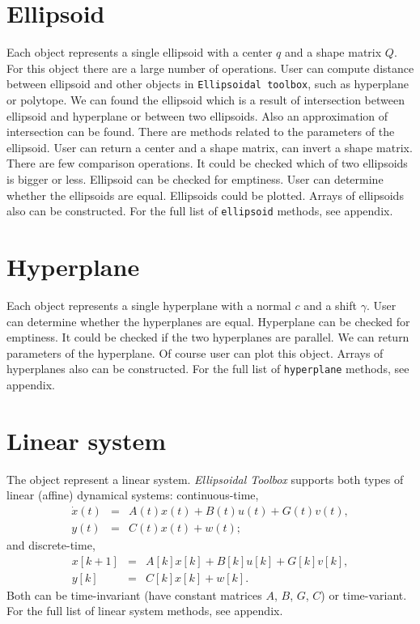 \section{Ellipsoid}
Each object represents a single ellipsoid with a center $q$ and a shape matrix $Q$.
For this object there are a large number of operations. User can compute distance
between ellipsoid and other objects in {\tt Ellipsoidal toolbox}, such as hyperplane
or polytope. We can found the ellipsoid which is a result of intersection between ellipsoid
and hyperplane or between two ellipsoids. Also an approximation of intersection can be found.
There are methods related to the parameters of the ellipsoid. User can return a center and
a shape matrix, can invert a shape matrix.
There are few comparison operations. It could be checked which of two ellipsoids is bigger
or less. Ellipsoid can be checked for emptiness. User can determine whether the
ellipsoids are equal. Ellipsoids could be plotted.
Arrays of ellipsoids also can be constructed.
For the full list of {\tt ellipsoid} methods, see appendix.

\section{Hyperplane}
Each object represents a single hyperplane with a normal $c$ and a shift $\gamma$.
User can determine whether the hyperplanes are equal. Hyperplane can be checked
for emptiness. It could be checked if the two hyperplanes are parallel.
We can return parameters of the hyperplane. Of course user can plot this object.
Arrays of hyperplanes also can be constructed.
For the full list of {\tt hyperplane} methods, see appendix.

\section{Linear system}
The object represent a linear system. {\it Ellipsoidal Toolbox} supports both
types of linear (affine) dynamical systems: continuous-time,
\begin{eqnarray*}
\dot{x}(t) & = & A(t)x(t) + B(t)u(t) + G(t)v(t),\\
y(t) & = & C(t)x(t) + w(t);
\end{eqnarray*}
and discrete-time,
\begin{eqnarray*}
x[k+1] & = & A[k]x[k] + B[k]u[k] + G[k]v[k], \\
y[k] & = & C[k]x[k] + w[k].
\end{eqnarray*}
Both can be time-invariant (have constant matrices $A$, $B$, $G$, $C$)
or time-variant.
For the full list of linear system methods, see appendix.



